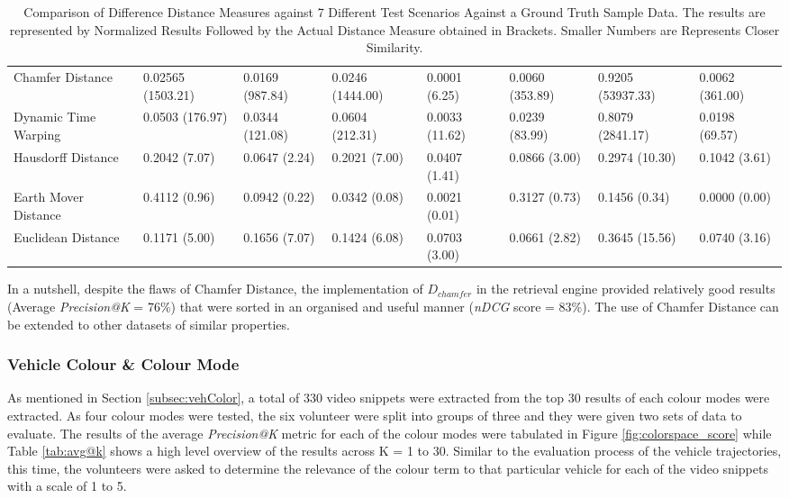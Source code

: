 \begin{table}[]
\begin{tabular}{llllllll}
Chamfer Distance & 0.02565 (1503.21) & 0.0169 (987.84) & 0.0246 (1444.00) & 0.0001 (6.25) & 0.0060 (353.89) & 0.9205 (53937.33) & 0.0062 (361.00) \\
Dynamic Time Warping & 0.0503 (176.97) & 0.0344 (121.08) & 0.0604 (212.31) & 0.0033 (11.62) & 0.0239 (83.99) & 0.8079 (2841.17) & 0.0198 (69.57) \\
Hausdorff Distance & 0.2042 (7.07) & 0.0647 (2.24) & 0.2021 (7.00) & 0.0407 (1.41) & 0.0866 (3.00) & 0.2974 (10.30) & 0.1042 (3.61) \\
Earth Mover Distance & 0.4112 (0.96) & 0.0942 (0.22) & 0.0342 (0.08) & 0.0021 (0.01) & 0.3127 (0.73) & 0.1456 (0.34) & 0.0000 (0.00) \\
Euclidean Distance & 0.1171 (5.00) & 0.1656 (7.07) & 0.1424 (6.08) & 0.0703 (3.00) & 0.0661 (2.82) & 0.3645 (15.56) & 0.0740 (3.16)
\end{tabular}
  \caption{Comparison of Difference Distance Measures against 7 Different Test Scenarios Against a Ground Truth Sample Data. The results are represented by Normalized Results Followed by the Actual Distance Measure obtained in Brackets. Smaller Numbers are Represents Closer Similarity.}
\label{table:DistanceCompare}
\end{table}

In a nutshell, despite the flaws of Chamfer Distance, the implementation of $D_{chamfer}$ in the retrieval engine provided relatively good results (Average \textit{Precision@K} = 76\%) that were sorted in an organised and useful manner (\textit{nDCG} score = 83\%). The use of Chamfer Distance can be extended to other datasets of similar properties.

\subsubsection{Vehicle Colour \& Colour Mode}
\label{subsec:vehiclecolourchamferdistanceexperiment}

As mentioned in Section \ref{subsec:vehColor}, a total of 330 video snippets were extracted from the top 30 results of each colour modes were extracted. As four colour modes were tested, the six volunteer were split into groups of three and they were given two sets of data to evaluate.
The results of the average \textit{Precision@K} metric for each of the colour modes were tabulated in Figure \ref{fig:colorspace_score} while Table \ref{tab:avg@k} shows a high level overview of the results across K = 1 to 30. Similar to the evaluation process of the vehicle trajectories, this time, the volunteers were asked to determine the relevance of the colour term to that particular vehicle for each of the video snippets with a scale of 1 to 5.

